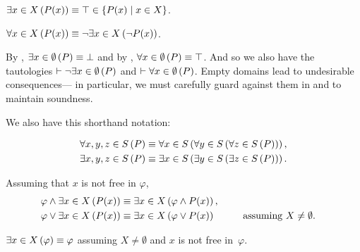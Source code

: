 \indexsym{}
\begin{definition}
  $\Exists{x\in X}{P(x)} \equiv
    \true \in \Set{P(x) \mid x\in X}$.
\end{definition}

\indexsym{}
\begin{definition}
  $\Forall{x\in X}{P(x)} \equiv \neg\Exists{x\in X}{\neg P(x)}$.
\end{definition}

\begin{remark}
  By , $\Exists{x\in\emptyset}P \equiv \false$
    and by , $\Forall{x\in\emptyset}P \equiv \true$.
  And so we also have the tautologies $\infer \neg\Exists{x\in\emptyset}P$
    and $\infer \Forall{x\in\emptyset}P$.
  Empty domains lead to undesirable consequences---%
    in particular,
      we must carefully guard against them in  and
         to maintain soundness.
\end{remark}

We also have this shorthand notation:

\begin{align}
  \Forall{x,y,z\in S}P \equiv
    \Forall{x\in S}{\Forall{y\in S}{\Forall{z\in S}P}}, \\
  \Exists{x,y,z\in S}P \equiv
    \Exists{x\in S}{\Exists{y\in S}{\Exists{z\in S}P}}.
\end{align}

\begin{definition}
  Assuming that $x$ is not free in $\varphi$,
  \begin{alignat*}{3}
    \varphi\land\Exists{x\in X}{P(x)}
      &\equiv \Exists{x\in X}{\varphi\land P(x)}, \\
    \varphi\lor\Exists{x\in X}{P(x)}
      &\equiv \Exists{x\in X}{\varphi\lor P(x)}
      \qquad&&\text{assuming $X\neq\emptyset$}.
  \end{alignat*}
\end{definition}

\begin{definition}
  $\Exists{x\in X}{\varphi} \equiv \varphi$ assuming $X\neq\emptyset$
    and $x$ is not free in~$\varphi$.
\end{definition}



